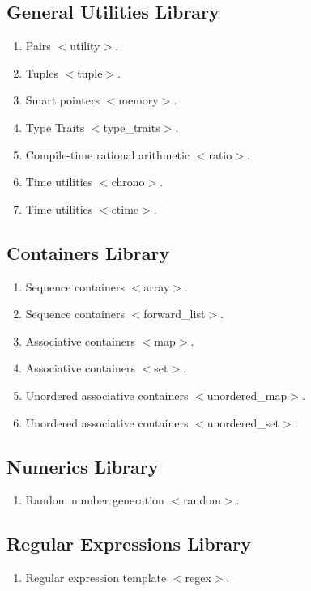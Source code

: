 \documentclass[11pt,]{report}
\begin{document}
\subsection{General Utilities Library}
\label{sub-section:General utilities library}
\begin{enumerate}
\item Pairs $<$utility$>$.
\item Tuples $<$tuple$>$.
\item Smart pointers $<$memory$>$.
\item Type Traits $<$type\_traits$>$.
\item Compile-time rational arithmetic $<$ratio$>$.
\item Time utilities $<$chrono$>$.
\item Time utilities $<$ctime$>$.
\end{enumerate}



\subsection{Containers Library}
\label{sub-section:Containers library}
\begin{enumerate}
\item Sequence containers $<$array$>$.
\item Sequence containers $<$forward\_list$>$.
\item Associative containers $<$map$>$.
\item Associative containers $<$set$>$.
\item Unordered associative containers $<$unordered\_map$>$. 
\item Unordered associative containers $<$unordered\_set$>$. 
\end{enumerate}

\subsection{Numerics Library}
\label{sub-section: Numerics library}
\begin{enumerate}
\item Random number generation $<$random$>$.
\end{enumerate}

\subsection{Regular Expressions Library}
\label{sub-section: Regular expressions library}
\begin{enumerate}
\item Regular expression template $<$regex$>$.
\end{enumerate}
\end{document}
